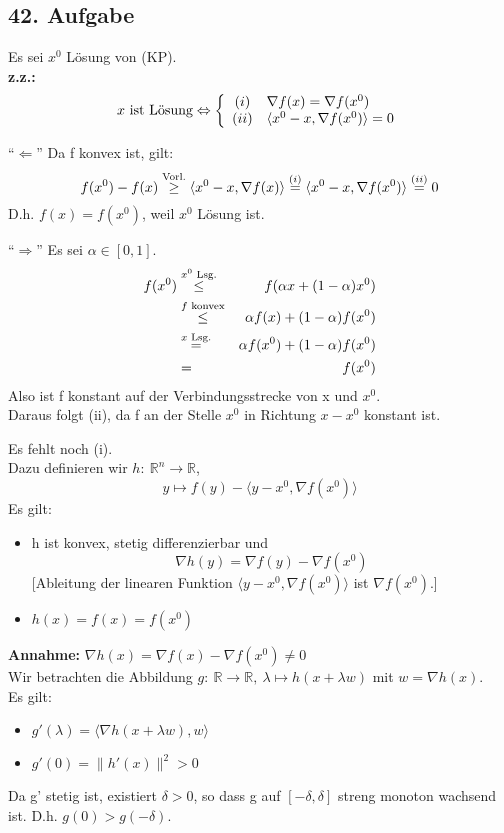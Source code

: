 \documentclass[a4paper,11pt,twoside,titlepage]{article}
\newcommand{\R}{{\mathbb R}}
\begin{document}
\subsection*{42. Aufgabe}
Es sei $x^0$ Lösung von (KP).\\
\textbf{z.z.:}
\[x \textnormal{ ist Lösung}\Leftrightarrow\left\{\begin{array}{cl}(i)&\nabla f(x)=\nabla f(x^0)\\
(ii)&\langle x^0-x,\nabla f(x^0)\rangle=0\end{array}\right.\]

"`$\Leftarrow$"' Da f konvex ist, gilt:
\[f(x^0)-f(x)\stackrel{\textnormal{Vorl.}}{\geq}\langle x^0-x,\nabla f(x)\rangle\stackrel{(i)}{=}\langle x^0-x,\nabla f(x^0)\rangle\stackrel{(ii)}{=}0\]
D.h. $f(x)=f(x^0)$, weil $x^0$ Lösung ist.

"`$\Rightarrow$"' Es sei $\alpha\in[0,1]$.
\begin{eqnarray*}
f(x^0)&\stackrel{x^0\textnormal{ Lsg.}}{\leq}&f(\alpha x+(1-\alpha)x^0)\\
&\stackrel{f \textnormal{ konvex}}{\leq}&\alpha f(x)+(1-\alpha)f(x^0)\\
&\stackrel{x\textnormal{ Lsg.}}{=}&\alpha f(x^0)+(1-\alpha)f(x^0)\\
&=&f(x^0)\end{eqnarray*}
Also ist f konstant auf der Verbindungsstrecke von x und $x^0$.\\
Daraus folgt (ii), da f an der Stelle $x^0$ in Richtung $x-x^0$ konstant ist.

Es fehlt noch (i).\\Dazu definieren wir $h:\ \R^n\to\R$,
\[y\mapsto f(y)-\langle y-x^0,\nabla f(x^0)\rangle\]
Es gilt:
\begin{itemize}
\item{h ist konvex, stetig differenzierbar und
\[\nabla h(y)=\nabla f(y)-\nabla f(x^0)\]
[Ableitung der linearen Funktion $\langle y-x^0,\nabla f(x^0)\rangle$ ist $\nabla f(x^0)$.]}
\item{ $h(x)=f(x)=f(x^0)$}
\end{itemize}

\textbf{Annahme: }$\nabla h(x)=\nabla f(x)-\nabla f(x^0)\neq 0$\\
Wir betrachten die Abbildung $g:\ \R\to\R,\ \lambda\mapsto h(x+\lambda w)$ mit $w=\nabla h(x)$.\\
Es gilt:
\begin{itemize}
\item{$g'(\lambda)=\langle \nabla h(x+\lambda w),w\rangle$}
\item{$g'(0)=\|h'(x)\|^2>0$}
\end{itemize}
Da g' stetig ist, existiert $\delta>0$, so dass g auf $[-\delta,\delta]$ streng monoton wachsend ist. D.h. $g(0)>g(-\delta)$.
\end{document}
